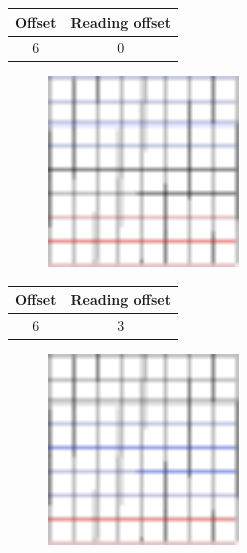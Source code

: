 \documentclass{beamer}
\begin{document}
\begin{frame}{}
    \begin{table}
        \centering
        \begin{tabular}{|c|c|}
            \hline
            Offset & Reading offset \\
            \hline
            6 & 0 \\
            \hline
        \end{tabular}
    \end{table}
    \begin{figure}
        \centering
        \includegraphics[width=0.45\textwidth]{grid_3r_3_ro_1.pdf}
        \label{fig:grid_3r_3_ro_1}
    \end{figure}
\end{frame}

\begin{frame}{}
    \begin{table}
        \centering
        \begin{tabular}{|c|c|}
            \hline
            Offset & Reading offset \\
            \hline
            6 & 3 \\
            \hline
        \end{tabular}
    \end{table}
    \begin{figure}
        \centering
        \includegraphics[width=0.45\textwidth]{grid_3r_3_ro_2.pdf}
        \label{fig:grid_3r_3_ro_2}
    \end{figure}
\end{frame}
\end{document}
